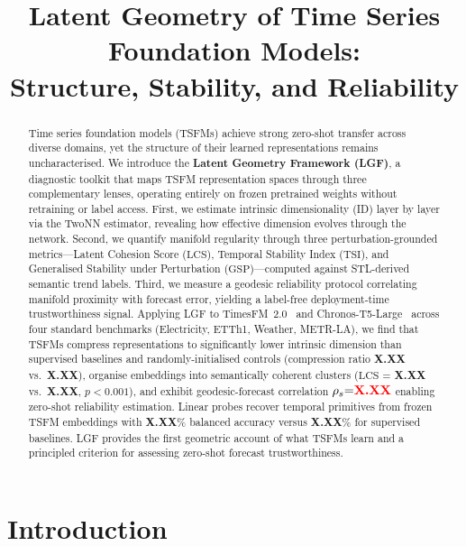 \documentclass[letterpaper,twocolumn]{article}
\title{Latent Geometry of Time Series Foundation Models:\\
       Structure, Stability, and Reliability}
\newcommand{\RESULT}[2]{{\color{red}\textbf{#2}}}
\newcommand{\lcs}{\ensuremath{\mathrm{LCS}}}
\newcommand{\tsi}{\ensuremath{\mathrm{TSI}}}
\newcommand{\gsp}{\ensuremath{\mathrm{GSP}}}
\newcommand{\rspear}{\ensuremath{\rho_{s}}}
\begin{document}
\maketitle

\begin{abstract}
Time series foundation models (TSFMs) achieve strong zero-shot transfer across
diverse domains, yet the structure of their learned representations remains
uncharacterised.
We introduce the \textbf{Latent Geometry Framework (LGF)}, a diagnostic toolkit
that maps TSFM representation spaces through three complementary lenses, operating
entirely on frozen pretrained weights without retraining or label access.
First, we estimate intrinsic dimensionality (ID) layer by layer via the TwoNN
estimator, revealing how effective dimension evolves through the network.
Second, we quantify manifold regularity through three perturbation-grounded
metrics---Latent Cohesion Score (\lcs), Temporal Stability Index (\tsi), and
Generalised Stability under Perturbation (\gsp)---computed against STL-derived
semantic trend labels.
Third, we measure a geodesic reliability protocol correlating manifold proximity
with forecast error, yielding a label-free deployment-time trustworthiness signal.
Applying LGF to TimesFM~2.0~\cite{das2024timesfm} and
Chronos-T5-Large~\cite{ansari2024chronos} across four standard benchmarks
(Electricity, ETTh1, Weather, METR-LA), we find that TSFMs compress representations
to significantly lower intrinsic dimension than supervised baselines and
randomly-initialised controls (compression ratio
\RESULT{cr-tsfm}{X.XX} vs.\ \RESULT{cr-base}{X.XX}), organise embeddings
into semantically coherent clusters (\lcs{} = \RESULT{lcs-tsfm}{X.XX}
vs.\ \RESULT{lcs-base}{X.XX}, $p{<}0.001$), and exhibit geodesic-forecast
correlation $\rspear{=}\RESULT{rho}{X.XX}$ enabling zero-shot reliability
estimation.
Linear probes recover temporal primitives from frozen TSFM embeddings with
\RESULT{probe-tsfm}{X.XX}\% balanced accuracy versus \RESULT{probe-base}{X.XX}\%
for supervised baselines.
LGF provides the first geometric account of what TSFMs learn and a principled
criterion for assessing zero-shot forecast trustworthiness.
\end{abstract}

\section{Introduction}
\label{sec:intro}
\end{document}
